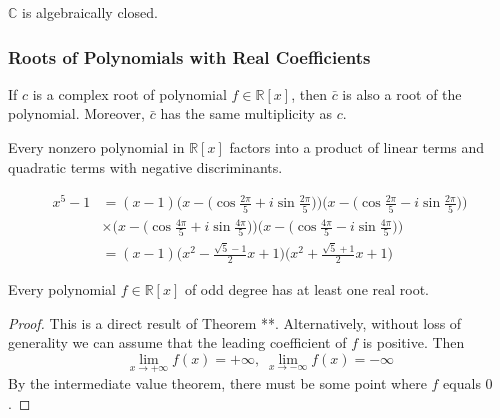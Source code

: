 \documentclass{article}
\begin{document}
      \begin{corollary}
        $\mathbb{C}$ is algebraically closed. 
      \end{corollary}

    \subsubsection{Roots of Polynomials with Real Coefficients}

      \begin{theorem}
        If $c$ is a complex root of polynomial $f \in \mathbb{R}[x]$, then $\bar{c}$ is also a root of the polynomial. Moreover, $\bar{c}$ has the same multiplicity as $c$. 
      \end{theorem}

      \begin{corollary}
        Every nonzero polynomial in $\mathbb{R}[x]$ factors into a product of linear terms and quadratic terms with negative discriminants. 
      \end{corollary}

      \begin{example}
      \begin{align*}
        x^5 - 1 & = (x-1) \bigg( x - \Big( \cos{\frac{2\pi}{5}} + i \sin{\frac{2\pi}{5}}\Big) \bigg) \bigg( x - \Big( \cos{\frac{2\pi}{5}} - i \sin{\frac{2\pi}{5}}\Big) \bigg) \\
        & \times \bigg( x - \Big( \cos{\frac{4\pi}{5}} + i \sin{\frac{4\pi}{5}}\Big) \bigg) \bigg( x - \Big( \cos{\frac{4\pi}{5}} - i \sin{\frac{4\pi}{5}}\Big) \bigg) \\
        & = (x-1) \bigg( x^2 - \frac{\sqrt{5} - 1}{2} x + 1\bigg) \bigg( x^2 + \frac{\sqrt{5} + 1}{2} x + 1\bigg) 
      \end{align*}
      \end{example}

      \begin{corollary}
        Every polynomial $f \in \mathbb{R}[x]$ of odd degree has at least one real root. 
      \end{corollary}
      \begin{proof}
        This is a direct result of Theorem **. Alternatively, without loss of generality we can assume that the leading coefficient of $f$ is positive. Then
        \begin{equation}
          \lim_{x \rightarrow + \infty} f(x) = + \infty, \; \lim_{x \rightarrow -\infty} f(x) = -\infty
        \end{equation}
        By the intermediate value theorem, there must be some point where $f$ equals $0$. 
      \end{proof}
\end{document}
